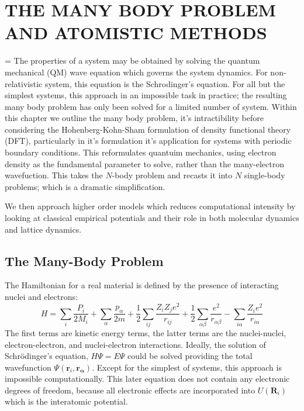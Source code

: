 \chapter{THE MANY BODY PROBLEM AND ATOMISTIC METHODS}
\hfuzz=20pt
\vfuzz=20pt
\vbadness=\maxdimen
The properties of a system may be obtained by solving the quantum mechanical (QM) wave equation which governs the system dynamics.  For non-relativistic system, this equation is the Schrodinger's equation.  For all but the simplest systems, this approach in an impossible task in practice; the resulting many body problem has only been solved for a limited number of system.  Within this chapter we outline the many body problem, it's intractibility before considering the Hohenberg-Kohn-Sham formulation of density functional theory (DFT), particularly in it's formulation it's application for systems with periodic boundary conditions.  This reformulates quantuim mechanics, using electron density as the fundamental parameter to solve, rather than the many-electron wavefuction.  This takes the $N$-body problem and recasts it into $N$ single-body problems; which is a dramatic simplification.

We then approach higher order models which reduces computational intensity by looking at classical empirical potentials and their role in both molecular dynamics and lattice dynamics.

\section{The Many-Body Problem}

The Hamiltonian for a real material is defined by the presence of interacting nuclei and electrons:
\begin{equation}
	H = \sum_i \frac{P_i}{2M_i}
	    + \sum_\alpha \frac{p_\alpha}{2m}
	    + \frac{1}{2} \sum_{ij} \frac{Z_i Z_j e^2}{r_{ij}}
	    + \frac{1}{2} \sum_{\alpha\beta} \frac{e^2}{r_{\alpha\beta}}
	    - \sum_{i\alpha} \frac{Z_i e^2}{r_{i\alpha}}
\end{equation}
The first terms are kinetic energy terms, the latter terms are the nuclei-nuclei, electron-electron, and nuclei-electron interactions.
Ideally, the solution of Schr\"{o}dinger's equation, $H\Psi=E\Psi$ could be solved providing the total wavefunction $\Psi(\bm{r}_i,\bm{r_\alpha})$.
Except for the simplest of systems, this approach is impossible computationally.
This later equation does not contain any electronic degrees of freedom, because all electronic effects are incorporated into $U(\bm{R}_i)$ which is the interatomic potential.

